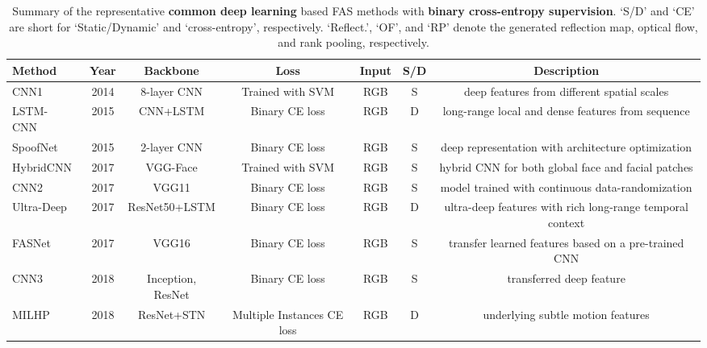 \documentclass[10pt,journal,compsoc]{IEEEtran}
\begin{document}
\begin{table}
\centering
\caption{Summary of the representative \textbf{common deep learning} based FAS methods with \textbf{binary cross-entropy supervision}. `S/D' and `CE' are short for `Static/Dynamic' and `cross-entropy', respectively. `Reflect.', `OF', and `RP' denote the generated reflection map, optical flow, and rank pooling, respectively.} \label{tab:binaryloss}
\resizebox{1.0\textwidth}{!} {\begin{tabular}{l c c c c c c} 
 \toprule[1pt]
 Method & Year & Backbone & Loss & Input & S/D & Description \\
 

   \midrule
CNN1~\cite{yang2014learn} & 2014 & 8-layer CNN & Trained with SVM & RGB & S & deep features from different spatial scales  \\ 
 
 
 
   \midrule
LSTM-CNN~\cite{Xu2016Learning} & 2015 & CNN+LSTM  & Binary CE loss & RGB & D & long-range local and dense features from sequence \\ 
  

   \midrule
SpoofNet~\cite{menotti2015deep} & 2015 & 2-layer CNN  & Binary CE loss & RGB & S & deep representation with architecture optimization \\ 

   \midrule
HybridCNN~\cite{li2017face} & 2017 & VGG-Face  & Trained with SVM & RGB & S & hybrid CNN for both global face and facial patches \\ 


   \midrule
CNN2~\cite{nagpal2019performance} & 2017 & VGG11 & Binary CE loss & RGB & S & model trained with continuous data-randomization  \\ 


   \midrule
Ultra-Deep~\cite{tu2017ultra} & 2017 & ResNet50+LSTM & Binary CE loss & RGB & D & ultra-deep features with rich long-range temporal context \\ 

    \midrule
FASNet~\cite{lucena2017transfer} & 2017 & VGG16  & Binary CE loss & RGB & S & transfer learned features based on a pre-trained CNN \\ 
 

   \midrule
CNN3~\cite{rehman2017deep} & 2018 & Inception, ResNet & Binary CE loss & RGB & S & transferred deep feature  \\ 
 
 
  \midrule
 MILHP~\cite{lin2018live} & 2018 & ResNet+STN  & Multiple Instances CE loss & RGB & D & underlying subtle motion features\\ 



\end{tabular}}
\end{table}
\end{document}
